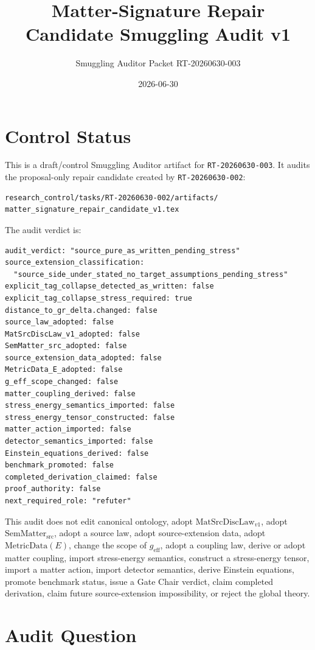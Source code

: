 \documentclass[11pt]{article}
\title{Matter-Signature Repair Candidate Smuggling Audit v1}
\author{Smuggling Auditor Packet RT-20260630-003}
\date{2026-06-30}
\newcommand{\MetricData}{\mathrm{MetricData}}
\newcommand{\geff}{g_{\mathrm{eff}}}
\newcommand{\MatSrcDiscLaw}{\mathrm{MatSrcDiscLaw}_{v1}}
\newcommand{\SemMatterSrc}{\mathrm{SemMatter}_{\mathrm{src}}}
\begin{document}
\maketitle

\section{Control Status}

This is a draft/control Smuggling Auditor artifact for
\texttt{RT-20260630-003}. It audits the proposal-only repair candidate created
by \texttt{RT-20260630-002}:

\begin{verbatim}
research_control/tasks/RT-20260630-002/artifacts/
matter_signature_repair_candidate_v1.tex
\end{verbatim}

The audit verdict is:

\begin{verbatim}
audit_verdict: "source_pure_as_written_pending_stress"
source_extension_classification:
  "source_side_under_stated_no_target_assumptions_pending_stress"
explicit_tag_collapse_detected_as_written: false
explicit_tag_collapse_stress_required: true
distance_to_gr_delta.changed: false
source_law_adopted: false
MatSrcDiscLaw_v1_adopted: false
SemMatter_src_adopted: false
source_extension_data_adopted: false
MetricData_E_adopted: false
g_eff_scope_changed: false
matter_coupling_derived: false
stress_energy_semantics_imported: false
stress_energy_tensor_constructed: false
matter_action_imported: false
detector_semantics_imported: false
Einstein_equations_derived: false
benchmark_promoted: false
completed_derivation_claimed: false
proof_authority: false
next_required_role: "refuter"
\end{verbatim}

This audit does not edit canonical ontology, adopt \(\MatSrcDiscLaw\), adopt
\(\SemMatterSrc\), adopt a source law, adopt source-extension data, adopt
\(\MetricData(E)\), change the scope of \(\geff\), adopt a coupling law,
derive or adopt matter coupling, import stress-energy semantics, construct a
stress-energy tensor, import a matter action, import detector semantics,
derive Einstein equations, promote benchmark status, issue a Gate Chair
verdict, claim completed derivation, claim future source-extension
impossibility, or reject the global theory.

\section{Audit Question}
\end{document}
